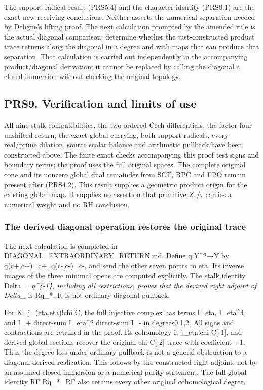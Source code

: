 The support radical result (PRS5.4) and the character identity (PRS8.1)
are the exact new receiving conclusions. Neither asserts the numerical
separation needed by Deligne's lifting proof. The next calculation
prompted by the amended rule is the actual diagonal comparison:
determine whether the just-constructed product trace returns along the
diagonal in a degree and with maps that can produce that separation.
That calculation is carried out independently in the accompanying
product/diagonal derivation; it cannot be replaced by calling the
diagonal a closed immersion without checking the original topology.

\subsection{PRS9. Verification and limits of
use}\label{prs9.-verification-and-limits-of-use}

All nine stalk compatibilities, the two ordered Čech differentials, the
factor-four unshifted return, the exact global currying, both support
radicals, every real/prime dilation, source scalar balance and
arithmetic pullback have been constructed above. The finite exact checks
accompanying this proof test signs and boundary terms; the proof uses
the full original spaces. The complete original cone and its nonzero
global dual remainder from SCT, RPC and FPO remain present after
(PRS4.2). This result supplies a geometric product origin for the
existing global map. It supplies no assertion that primitive
\(Z_1/\tau\) carries a numerical weight and no RH conclusion.

\subsubsection{The derived diagonal operation restores the original
trace}\label{the-derived-diagonal-operation-restores-the-original-trace}

The next calculation is completed in DIAGONAL\_EXTRAORDINARY\_RETURN.md.
Define q:Y\^{}2→Y by q(c+,c+)=c+, q(c-,c-)=c-, and send the other seven
points to eta. Its inverse images of the three minimal opens are
computed explicitly. The stalk identity Delta\_\emph{=q\^{}\{-1\},
including all restrictions, proves that the derived right adjoint of
Delta\_} is Rq\_*. It is not ordinary diagonal pullback.

For K=j\_(eta,eta)!chi C, the full injective complex has terms I\_eta,
I\_eta\^{}4, and I\_+ direct-sum I\_eta\^{}2 direct-sum I\_- in
degrees0,1,2. All signs and contractions are retained in the proof. Its
cohomology is j\_eta!chi C{[}-1{]}, and derived global sections recover
the original chi C{[}-2{]} trace with coefficient +1. Thus the degree
loss under ordinary pullback is not a general obstruction to a
diagonal-derived realization. This follows by the constructed right
adjoint, not by an assumed closed immersion or a numerical purity
statement. The full global identity RΓ Rq\_*=RΓ also retains every other
original cohomological degree.

